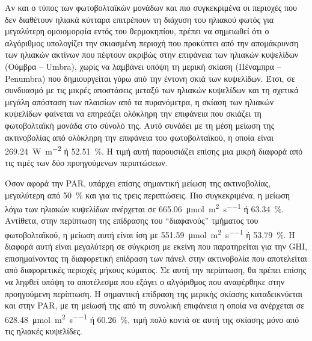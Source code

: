\documentclass[12pt, a4paper]{report} %
\newcommand{\english}{\foreignlanguage{english}}
\begin{document}
Αν και ο τύπος των φωτοβολταϊκών μονάδων και πιο συγκεκριμένα οι περιοχές που δεν διαθέτουν ηλιακά κύτταρα επιτρέπουν τη διάχυση 
του ηλιακού φωτός για μεγαλύτερη ομοιομορφία εντός του θερμοκηπίου, πρέπει να σημειωθεί ότι ο αλγόριθμος υπολογίζει την 
σκιασμένη περιοχή που προκύπτει από την απομάκρυνση των ηλιακών ακτίνων που πέφτουν ακριβώς στην επιφάνεια των ηλιακών κυψελίδων 
(Ούμβρα – \english{Umbra}), χωρίς να λαμβάνει υπόψη τη μερική σκίαση (Πέναμπρα – \english{Penumbra}) που δημιουργείται γύρω 
από την έντονη σκιά των κυψελίδων. Έτσι, σε συνδυασμό με τις μικρές αποστάσεις μεταξύ των ηλιακών κυψελίδων και τη σχετικά 
μεγάλη απόσταση των πλαισίων από τα πυρανόμετρα, η σκίαση των ηλιακών κυψελίδων φαίνεται να επηρεάζει ολόκληρη την επιφάνεια 
που σκιάζει τη φωτοβολταϊκή μονάδα στο σύνολό της. Αυτό συνάδει με τη μέση μείωση της ακτινοβολίας από ολόκληρη την επιφάνεια 
του φωτοβολταϊκού, η οποία είναι \SI{269,24}{\watt\per\meter\squared} ή \SI{52,51}{\percent}. Η τιμή αυτή παρουσιάζει επίσης 
μια μικρή διαφορά από τις τιμές των δύο προηγούμενων περιπτώσεων.

Όσον αφορά την \english{PAR}, υπάρχει επίσης σημαντική μείωση της ακτινοβολίας, μεγαλύτερη από \SI{50}{\percent} και για τις 
τρεις περιπτώσεις. Πιο συγκεκριμένα, η μείωση λόγω των ηλιακών κυψελίδων ανέρχεται σε 
\SI{665,06}{\micro\mol\per\meter\squared\per\second} ή \SI{63,34}{\percent}. Αντίθετα, στην περίπτωση της επίδρασης του “διαφανούς” 
τμήματος του φωτοβολταϊκού, η μείωση αυτή είναι ίση με \SI{551,59}{\micro\mol\per\meter\squared\per\second} ή \SI{53,79}{\percent}. 
Η διαφορά αυτή είναι μεγαλύτερη σε σύγκριση με εκείνη που παρατηρείται για την \english{GHI}, επισημαίνοντας τη διαφορετική 
επίδραση των πάνελ στην ακτινοβολία που αποτελείται από διαφορετικές περιοχές μήκους κύματος. Σε αυτή την περίπτωση, θα πρέπει 
επίσης να ληφθεί υπόψη το αποτέλεσμα που εξάγει ο αλγόριθμος που αναφέρθηκε στην προηγούμενη περίπτωση. Η σημαντική επίδραση της 
μερικής σκίασης καταδεικνύεται και στην \english{PAR}, με τη μείωσή της από τη συνολική επιφάνεια η οποία να ανέρχεται σε 
\SI{628,48}{\micro\mol\per\meter\squared\per\second} ή \SI{60,26}{\percent}, τιμή πολύ κοντά σε αυτή της σκίασης μόνο από τις 
ηλιακές κυψελίδες.
\end{document}
